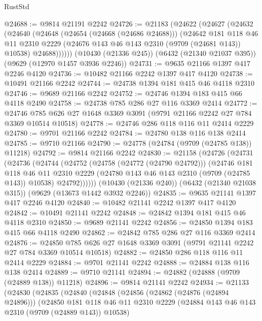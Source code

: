 \begin{lexlean}{RustStd}
\begin{coremodule}
@24688 := @9814 @21191 @2242
@24726 := @21183
    (@24622
      (@24627
        (@24632
          (@24640
            (@24648
              (@24654 (@24668 (@24686 @24688)))
              (@24642
                @181
                @118
                @46
                @11
                @2310
                @2229
                (@24676 @143 @46 @143 @2310 (@9709 (@24681 @143)) @10538)
                @24688))))))
    (@10430 (@21336 @245))
    (@6432 (@21340 @21037 @395))
    (@9629 (@12970 @1457 @3936 @2246))
@24731 := @9635 @21166 @1397 @417 @2246 @4120
@24736 := @10482 @21166 @2242 @1397 @417 @4120
@24738 := @10491 @21166 @2242
@24744 := @24738 @1394 @181 @415 @46 @4118 @2310
@24746 := @9689 @21166 @2242
@24752 := @24746 @1394 @183 @415 @66 @4118 @2490
@24758 := @24738 @785 @286 @27 @116 @3369 @2414
@24772 := @24746 @785 @626 @27 @1648 @3369 @3091 (@9791 @21166 @2242 @27 @784 @3369 @10514 @10518)
@24778 := @24746 @286 @118 @116 @11 @2414 @2229
@24780 := @9701 @21166 @2242
@24784 := @24780 @138 @116 @138 @2414
@24785 := @9710 @21166
@24790 := @24778 (@24784 (@9709 (@24785 @138)) @11218)
@24792 := @9814 @21166 @2242
@24830 := @21158
    (@24726
      (@24731
        (@24736
          (@24744
            (@24752
              (@24758 (@24772 (@24790 @24792)))
              (@24746
                @181
                @118
                @46
                @11
                @2310
                @2229
                (@24780 @143 @46 @143 @2310 (@9709 (@24785 @143)) @10538)
                @24792))))))
    (@10430 (@21336 @240))
    (@6432 (@21340 @21038 @315))
    (@9629 (@13673 @1442 @3932 @2246))
@24835 := @9635 @21141 @1397 @417 @2246 @4120
@24840 := @10482 @21141 @2242 @1397 @417 @4120
@24842 := @10491 @21141 @2242
@24848 := @24842 @1394 @181 @415 @46 @4118 @2310
@24850 := @9689 @21141 @2242
@24856 := @24850 @1394 @183 @415 @66 @4118 @2490
@24862 := @24842 @785 @286 @27 @116 @3369 @2414
@24876 := @24850 @785 @626 @27 @1648 @3369 @3091 (@9791 @21141 @2242 @27 @784 @3369 @10514 @10518)
@24882 := @24850 @286 @118 @116 @11 @2414 @2229
@24884 := @9701 @21141 @2242
@24888 := @24884 @138 @116 @138 @2414
@24889 := @9710 @21141
@24894 := @24882 (@24888 (@9709 (@24889 @138)) @11218)
@24896 := @9814 @21141 @2242
@24934 := @21133
    (@24830
      (@24835
        (@24840
          (@24848
            (@24856
              (@24862 (@24876 (@24894 @24896)))
              (@24850
                @181
                @118
                @46
                @11
                @2310
                @2229
                (@24884 @143 @46 @143 @2310 (@9709 (@24889 @143)) @10538)

\end{coremodule}
\end{lexlean}

